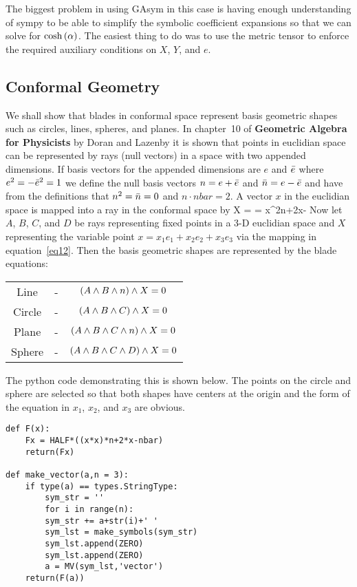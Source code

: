 \documentclass{article}
\begin{document}
The biggest problem in using GAsym in this case is having enough understanding of sympy to be able to 
simplify the symbolic coefficient expansions so that we can solve for $\cosh\left (\alpha\right )$. The easiest thing to do
 was to use the metric tensor to enforce the required auxiliary conditions on $X$, $Y$, and $e$. 

\subsection{Conformal Geometry}

We shall show that blades in conformal space represent basis geometric shapes such as circles, lines, spheres,
and planes. In chapter~10 of {\bf Geometric Algebra for Physicists} by Doran and Lazenby it is shown that points
in euclidian space can be represented by rays (null vectors) in a space with two appended dimensions. If basis
vectors for the appended dimensions are $e$ and $\bar{e}$ where $e^{2} = -\bar{e}^2 = 1$ we define the null basis
vectors $n = e+\bar{e}$ and $\bar{n} = e-\bar{e}$ and have from the definitions that $n^{2} = \bar{n} = 0$ and
$n\cdot nbar = 2$. A vector $x$ in the euclidian space is mapped into a ray in the conformal space by
\be\label{eq12}
X =  = \half\lp x^{2}n+2x-\nbar\rp
\ee
Now let $A$, $B$, $C$, and $D$ be rays representing fixed points in a 3-D euclidian space and $X$ representing
the variable point $x = x_{1}e_{1}+x_{2}e_{2}+x_{3}e_{3}$ via the mapping in equation~\ref{eq12}.  Then the
basis geometric shapes are represented by the blade equations:

\begin{center}
\begin{tabular}{ccc}
Line & - & $\left ( A\wedge B\wedge n \right )\wedge X = 0$ \\
Circle & - & $\left ( A\wedge B\wedge C \right )\wedge X = 0$ \\
Plane & - & $\left ( A\wedge B\wedge C\wedge n \right )\wedge X = 0$ \\
Sphere & - & $\left ( A\wedge B\wedge C\wedge D \right )\wedge X = 0$ \\
\end{tabular}
\end{center}

The python code demonstrating this is shown below.  The points on the circle and sphere are selected so that both
shapes have centers at the origin and the form of the equation in $x_{1}$, $x_{2}$, and $x_{3}$ are obvious.

\begin{verbatim}
def F(x):
    Fx = HALF*((x*x)*n+2*x-nbar)
    return(Fx)

def make_vector(a,n = 3):
    if type(a) == types.StringType:
        sym_str = ''
        for i in range(n):
        sym_str += a+str(i)+' '
        sym_lst = make_symbols(sym_str)
        sym_lst.append(ZERO)
        sym_lst.append(ZERO)
        a = MV(sym_lst,'vector')
    return(F(a))
\end{verbatim}
\end{document}
